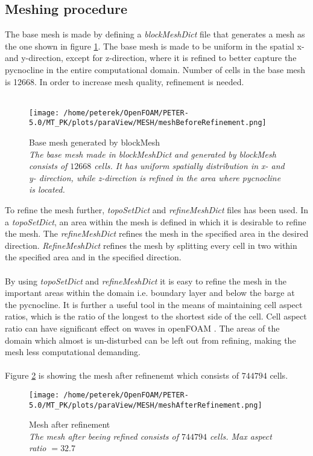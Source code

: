 \documentclass[a4paper, 12pt]{report}
\begin{document}
\subsection{Meshing procedure}
The base mesh is made by defining a \textit{blockMeshDict} file that generates a mesh as the one shown in figure \ref{fig:baseMesh}. The base mesh is made to be uniform in the spatial x- and y-direction, except for z-direction, where it is refined to better capture the pycnocline in the entire computational domain. Number of cells in the base mesh is 12668. In order to increase mesh quality, refinement is needed.\\
\\
\begin{figure}[H]
	\centering
	\texttt{[image: /home/peterek/OpenFOAM/PETER-5.0/MT\_PK/plots/paraView/MESH/meshBeforeRefinement.png]}
	\caption{Base mesh generated by blockMesh\\ \textit{The base mesh made in blockMeshDict and generated by blockMesh consists of $12668$ cells. It has uniform spatially distribution in x- and y- direction, while z-direction is refined in the area where pycnocline is located.}}
	\label{fig:baseMesh}
\end{figure}

To refine the mesh further, \textit{topoSetDict} and \textit{refineMeshDict} files has been used. In a \textit{topoSetDict}, an area within the mesh is defined in which it is desirable to refine the mesh. The \textit{refineMeshDict} refines the mesh in the specified area in the desired direction. \textit{RefineMeshDict} refines the mesh by splitting every cell in two within the specified area and in the specified direction.\\
\\
By using \textit{topoSetDict} and \textit{refineMeshDict} it is easy to refine the mesh in the important areas within the domain i.e. boundary layer and below the barge at the pycnocline. It is further a useful tool in the means of maintaining cell aspect ratios, which is the ratio of the longest to the shortest side of the cell. Cell aspect ratio can have significant effect on waves in openFOAM \cite{Roenby}. The areas of the domain which almost is un-disturbed can be left out from refining, making the mesh less computational demanding.\\
\\
Figure \ref{fig:RefinedMesh} is showing the mesh after refinenemt which consists of $744794$ cells. 
\begin{figure}[H]
	\centering
	\texttt{[image: /home/peterek/OpenFOAM/PETER-5.0/MT\_PK/plots/paraView/MESH/meshAfterRefinement.png]}
	\caption{Mesh after refinement\\ \textit{The mesh after beeing refined consists of $744794$ cells. Max aspect ratio $= 32.7$  }}
	\label{fig:RefinedMesh}
\end{figure}
\end{document}
